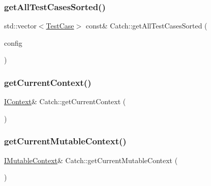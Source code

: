 \hypertarget{namespace_catch_a1c9b1a23bc947ea70ddaabf067276cf2}{}\label{namespace_catch_a1c9b1a23bc947ea70ddaabf067276cf2} 
\subsubsection{\texorpdfstring{get\+All\+Test\+Cases\+Sorted()}{getAllTestCasesSorted()}}
{\footnotesize\ttfamily std\+::vector$<$\hyperlink{class_catch_1_1_test_case}{Test\+Case}$>$ const\& Catch\+::get\+All\+Test\+Cases\+Sorted (\begin{DoxyParamCaption}\item[{I\+Config const \&}]{config }\end{DoxyParamCaption})}

\hypertarget{namespace_catch_ad517cca9b21deb79101e90e5508dd161}{}\label{namespace_catch_ad517cca9b21deb79101e90e5508dd161} 
\subsubsection{\texorpdfstring{get\+Current\+Context()}{getCurrentContext()}}
{\footnotesize\ttfamily \hyperlink{struct_catch_1_1_i_context}{I\+Context}\& Catch\+::get\+Current\+Context (\begin{DoxyParamCaption}{ }\end{DoxyParamCaption})}

\hypertarget{namespace_catch_af7bb0c32ab2453d2f53e92a96d15360e}{}\label{namespace_catch_af7bb0c32ab2453d2f53e92a96d15360e} 
\subsubsection{\texorpdfstring{get\+Current\+Mutable\+Context()}{getCurrentMutableContext()}}
{\footnotesize\ttfamily \hyperlink{struct_catch_1_1_i_mutable_context}{I\+Mutable\+Context}\& Catch\+::get\+Current\+Mutable\+Context (\begin{DoxyParamCaption}{ }\end{DoxyParamCaption})}

\hypertarget{namespace_catch_ac9ddcc6d66079add9cb2a3140b8ae51e}{}\label{namespace_catch_ac9ddcc6d66079add9cb2a3140b8ae51e} 
